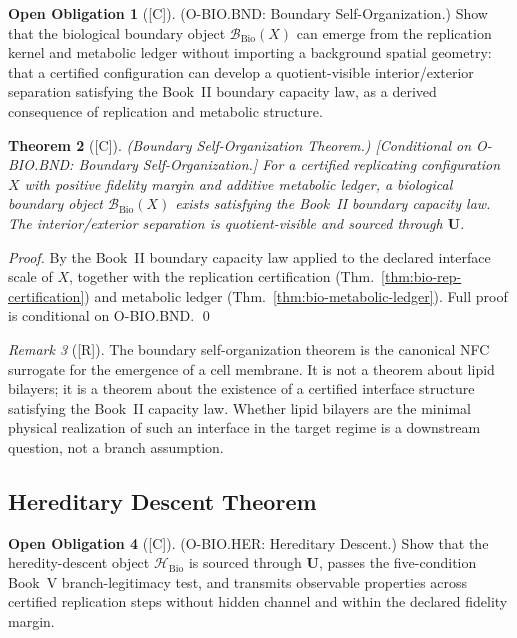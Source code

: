 \documentclass[12pt,oneside]{amsbook}
\theoremstyle{plain}
\newtheorem{theorem}{Theorem}[section]
\theoremstyle{definition}
\newtheorem{obligation}[theorem]{Open Obligation}
\theoremstyle{remark}
\newtheorem{remark}[theorem]{Remark}
\newcommand{\status}[1]{\textup{[#1]}}
\begin{document}
\begin{obligation}[\status{C}]\label{ob:bio-BND}
\textup{(O-BIO.BND: Boundary Self-Organization.)}
Show that the biological boundary object $\mathcal{B}_{\mathrm{Bio}}(X)$
can emerge from the replication kernel and metabolic ledger without
importing a background spatial geometry: that a certified
configuration can develop a quotient-visible interior/exterior
separation satisfying the Book~II boundary capacity law, as a derived
consequence of replication and metabolic structure.
\end{obligation}

\begin{theorem}[\status{C}]\label{thm:bio-boundary}
\textup{(Boundary Self-Organization Theorem.)}
\textup{[Conditional on O-BIO.BND: Boundary Self-Organization.]}
For a certified replicating configuration $X$ with positive fidelity
margin and additive metabolic ledger, a biological boundary object
$\mathcal{B}_{\mathrm{Bio}}(X)$ exists satisfying the Book~II
boundary capacity law. The interior/exterior separation is
quotient-visible and sourced through $\mathbf{U}$.
\end{theorem}

\begin{proof}
By the Book~II boundary capacity law applied to the declared interface
scale of $X$, together with the replication certification
(Thm.~\ref{thm:bio-rep-certification}) and metabolic ledger
(Thm.~\ref{thm:bio-metabolic-ledger}). Full proof is conditional on
O-BIO.BND.
\qed
\end{proof}

\begin{remark}[\status{R}]\label{rem:bio-bnd-note}
The boundary self-organization theorem is the canonical NFC surrogate
for the emergence of a cell membrane. It is not a theorem about
lipid bilayers; it is a theorem about the existence of a certified
interface structure satisfying the Book~II capacity law. Whether
lipid bilayers are the minimal physical realization of such an
interface in the target regime is a downstream question, not a branch
assumption.
\end{remark}

\subsection{Hereditary Descent Theorem}\label{sec:bio-HER}

\begin{obligation}[\status{C}]\label{ob:bio-HER}
\textup{(O-BIO.HER: Hereditary Descent.)}
Show that the heredity-descent object $\mathcal{H}_{\mathrm{Bio}}$ is
sourced through $\mathbf{U}$, passes the five-condition Book~V
branch-legitimacy test, and transmits observable properties across
certified replication steps without hidden channel and within the
declared fidelity margin.
\end{obligation}
\end{document}
